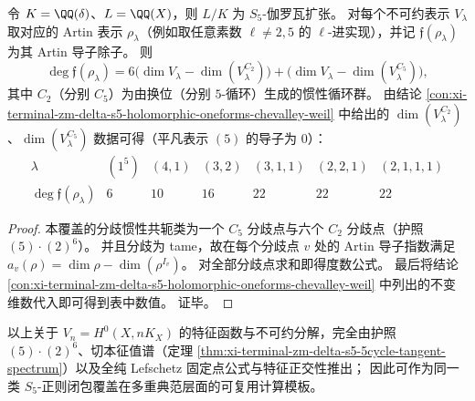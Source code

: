 \begin{proposition}\label{prop:xi-terminal-zm-delta-s5-artin-conductor-degrees}
令 \(K=\QQ(\delta)\)、\(L=\QQ(X)\)，则 \(L/K\) 为 \(S_5\)-伽罗瓦扩张。
对每个不可约表示 \(V_\lambda\) 取对应的 Artin 表示 \(\rho_\lambda\)（例如取任意素数 \(\ell\ne 2,5\) 的 \(\ell\)-进实现），并记 \(\mathfrak f(\rho_\lambda)\) 为其 Artin 导子除子。
则
\[
\deg\mathfrak f(\rho_\lambda)
=6\bigl(\dim V_\lambda-\dim(V_\lambda^{C_2})\bigr)
+\bigl(\dim V_\lambda-\dim(V_\lambda^{C_5})\bigr),
\]
其中 \(C_2\)（分别 \(C_5\)）为由换位（分别 \(5\)-循环）生成的惯性循环群。
由结论 \ref{con:xi-terminal-zm-delta-s5-holomorphic-oneforms-chevalley-weil} 中给出的 \(\dim(V_\lambda^{C_2})\)、\(\dim(V_\lambda^{C_5})\) 数据可得（平凡表示 \((5)\) 的导子为 \(0\)）：
\[
\begin{array}{c|cccccc}
\lambda & (1^5) & (4,1) & (3,2) & (3,1,1) & (2,2,1) & (2,1,1,1)\\ \hline
\deg\mathfrak f(\rho_\lambda) & 6 & 10 & 16 & 22 & 22 & 22
\end{array}
\]
\end{proposition}
\begin{proof}
本覆盖的分歧惯性共轭类为一个 \(C_5\) 分歧点与六个 \(C_2\) 分歧点（护照 \((5)\cdot(2)^6\)）。
并且分歧为 tame，故在每个分歧点 \(v\) 处的 Artin 导子指数满足
\(
a_v(\rho)=\dim\rho-\dim(\rho^{I_v})
\)。
对全部分歧点求和即得度数公式。
最后将结论 \ref{con:xi-terminal-zm-delta-s5-holomorphic-oneforms-chevalley-weil} 中列出的不变维数代入即可得到表中数值。
证毕。
\end{proof}

\begin{remark}[关于表述的可迁移性]\label{rem:xi-terminal-zm-delta-s5-pluricanonical-transferability}
以上关于 \(V_n=H^0(X,nK_X)\) 的特征函数与不可约分解，完全由护照 \((5)\cdot(2)^6\)、切本征值谱（定理 \ref{thm:xi-terminal-zm-delta-s5-5cycle-tangent-spectrum}）以及全纯 Lefschetz 固定点公式与特征正交性推出；
因此可作为同一类 \(S_5\)-正则闭包覆盖在多重典范层面的可复用计算模板。
\end{remark}

\endinput

